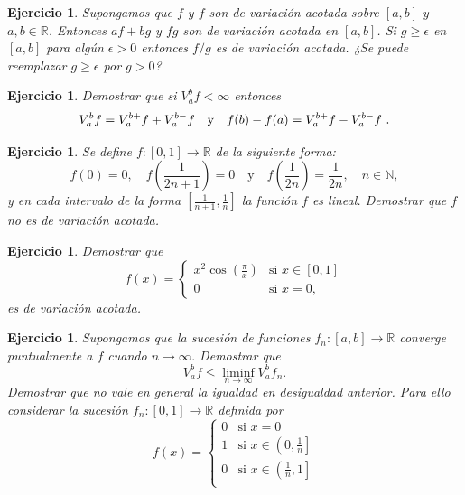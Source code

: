 \documentclass{article}
\newcounter{ejer}
\newtheorem{ejercicio}[ejer]{Ejercicio}}
\newcommand{\rr}{\mathbb{R}}
\newcommand{\nn}{\mathbb{N}}
\begin{document}
\begin{ejercicio} Supongamos que $f$ y $f$ son de variación acotada sobre $[a,b]$ y $a,b\in\rr$. Entonces $af+bg$ y $fg$ son de variación acotada en $[a,b]$. Si $g\geq \epsilon$ en $[a,b]$ para algún $\epsilon>0$ entonces $f/g$ es de variación acotada. ¿Se puede reemplazar  $g\geq \epsilon$ por  $g> 0$?
\end{ejercicio}

\begin{ejercicio} Demostrar que si $V_a^bf<\infty$ entonces
 \[V_a^bf=V_a^{b+}f + V_a^{b-}f\quad\hbox{y}\quad f(b)-f(a)=V_a^{b+}f -V_a^{b-}f\ .\]
\end{ejercicio}

\begin{ejercicio} Se define $f:[0,1]\to\rr$ de la siguiente forma:
 \[f(0)=0,\quad f\left(\frac{1}{2n+1}\right)=0\quad\text{y}\quad f\left(\frac{1}{2n}\right)=\frac{1}{2n},\quad n\in\nn,\]
 y en cada intervalo de la forma $[\frac{1}{n+1}, \frac{1}{n}]$ la función $f$ es lineal. Demostrar que $f$ no es de variación acotada.
\end{ejercicio}

\begin{ejercicio} Demostrar que
\[f(x)=\left\{\begin{array}{ll}
        x^2\cos\left(\frac{\pi}{x}\right) &\text{si } x\in [0,1]\\
        0                                 &\text{si } x=0,
       \end{array}
       \right.
\]
es de variación acotada.
\end{ejercicio}

\begin{ejercicio} Supongamos que la sucesión de funciones $f_n:[a,b]\to\rr$ converge puntualmente a $f$ cuando $n\to\infty$. Demostrar que
\[V_a^bf\leq \liminf_{n\to\infty}V_a^bf_n.\]
Demostrar que no vale en general la igualdad en desigualdad anterior. Para ello considerar la sucesión $f_n:[0,1]\to\rr$ definida por
\[f(x)=\left\{\begin{array}{ll}
        0               &\text{si } x=0\\
        1                &\text{si } x\in\left(0,\frac{1}{n}\right]\\
        0                             &\text{si } x\in\left(\frac{1}{n}, 1\right]\\
       \end{array}
       \right.
\]


\end{ejercicio}
\end{document}
